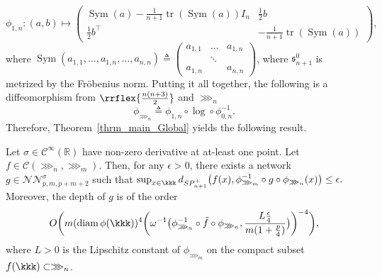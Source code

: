 $$
\phi_{1,n}:(a,b)\mapsto \begin{pmatrix}
\operatorname{Sym}(a) - \frac{1}{n+1}\operatorname{tr}(\operatorname{Sym}(a)) I_n & \frac1{2} b\\
\frac1{2}b^{\top} & -\frac{1}{n+1}\operatorname{tr}(\operatorname{Sym}(a))
\end{pmatrix}
,
$$
where $\operatorname{Sym}
\left(
a_{1,1},\dots,a_{1,n},\dots,a_{n,n}
\right)
\triangleq
\begin{pmatrix}
a_{1,1} & \dots & a_{1,n} \\
  & \ddots &  \\
a_{1,n}  &  & a_{n,n}
\end{pmatrix}
$, where $\mathfrak{s}_{n+1}^0$ is metrized by the Fr\"{o}benius norm.  Putting it all together, the following is a diffeomorphism from $\rrflex{\frac{n(n+3)}{2}}$ and $\ggg_n$
$$
\phi_{\ggg_n}\triangleq \phi_{1,n} \circ \log \circ \phi_{0,n}^{-1}.
$$
Therefore, Theorem~\ref{thrm_main_Global} yields the following result.  
\begin{corollary}\label{cor_UAT_Gaussian_Data}
Let $\sigma \in \mathcal{C}^{\infty}(\mathbb{R})$ have non-zero derivative at at-least one point. Let $f \in \mathcal{C}(\ggg_n, \ggg_m)$. Then, for any $\epsilon >0$, there exists a network $g \in \mathcal{NN}_{p,m,p+m+2}^{\sigma}$ such that
$
    \sup_{x \in \kkk} d_{SP_{n+1}^+} \big ( f(x), \phi_{\ggg_m}^{-1} \circ g \circ \phi_{\ggg_n} (x) \big) \leq \epsilon
    .
    $  
Moreover, the depth of $g$ is of the order 
    \begin{equation*}
        O\bigg(m (\text{diam} \, \phi(\kkk))^{4} \bigg(\omega^{-1} \big(\phi_{\ggg_n}^{-1} \circ \tilde f \circ \phi_{\ggg_n}, \frac{L \frac{\epsilon}{4}}{m(1+\frac{p}{4})} \big) \bigg)^{-4} \bigg)
        ,
    \end{equation*}
    where $L>0$ is the Lipschitz constant of $\phi_{\ggg_m}$ on the compact subset $f(\kkk)\subset \ggg_n$.  
\end{corollary}


